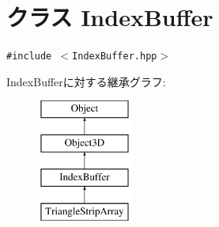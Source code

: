 \hypertarget{classm3g_1_1IndexBuffer}{
\section{クラス IndexBuffer}
\label{classm3g_1_1IndexBuffer}
}
{\tt \#include $<$IndexBuffer.hpp$>$}

IndexBufferに対する継承グラフ:\begin{figure}[H]
\begin{center}
\leavevmode
\includegraphics[height=4cm]{classm3g_1_1IndexBuffer}
\end{center}
\end{figure}
